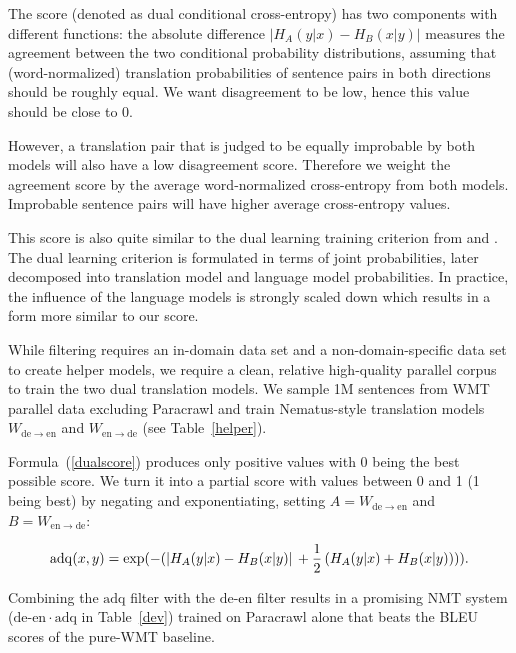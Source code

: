 \documentclass[11pt,a4paper]{article}
\begin{document}
The score (denoted as dual conditional cross-entropy) has two components with different functions: the absolute difference $\left| H_{A}(y|x) - H_{B}(x|y) \right|$ measures the agreement between the two conditional probability distributions, assuming that (word-normalized) translation probabilities of sentence pairs in both directions should be roughly equal. We want disagreement to be low, hence this value should be close to 0. 

However, a translation pair that is judged to be equally improbable by both models will also have a low disagreement score. Therefore we weight the agreement score by the average word-normalized cross-entropy from both models. Improbable sentence pairs will have higher average cross-entropy values. 

This score is also quite similar to the dual learning training criterion from  and . The dual learning criterion is formulated in terms of joint probabilities, later decomposed into translation model and language model probabilities. In practice, the influence of the language models is strongly scaled down which results in a form more similar to our score. 

While \citeauthor{moore-lewis:2010:Short} filtering requires an in-domain data set and a non-domain-specific data set to create helper models, we require a clean, relative high-quality parallel corpus to train the two dual translation models. We sample 1M sentences from WMT parallel data excluding Paracrawl and train Nematus-style translation models $W_{\mathrm{de}\rightarrow\mathrm{en}}$ and $W_{\mathrm{en}\rightarrow\mathrm{de}}$ (see Table~\ref{helper}).

Formula~(\ref{dualscore}) produces only positive values with 0 being the best possible score. We turn it into a partial score with values between 0 and 1 (1 being best) by negating and exponentiating, setting 
$A = W_{\mathrm{de}\rightarrow\mathrm{en}}$ and
$B = W_{\mathrm{en}\rightarrow\mathrm{de}}$:

\begin{dmath*}
\mathrm{adq}(x,y) = \exp(-( \left| H_{A}(y|x) - H_{B}(x|y) \right|\\ 
   + \frac{1}{2} \left( H_{A}(y|x) + H_{B}(x|y) \right))).
\end{dmath*}

Combining the $\mathrm{adq}$ filter with the $\mathrm{de\textrm{-}en}$ filter results in  a promising NMT system ($\mathrm{de\textrm{-}en}\cdot\mathrm{adq}$ in Table~\ref{dev}) trained on Paracrawl alone that beats the BLEU scores of the pure-WMT baseline. 
\end{document}
